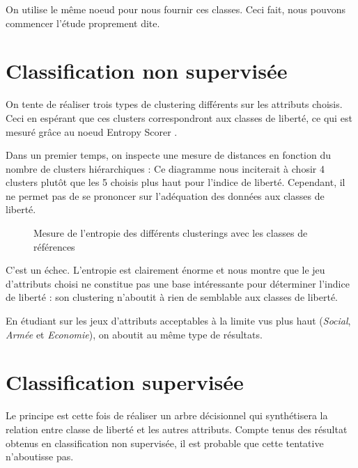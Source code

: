 On utilise le même noeud pour nous fournir ces classes. Ceci fait, nous pouvons commencer l'étude proprement dite.

\section{Classification non supervisée}
On tente de réaliser trois types de clustering différents sur les attributs choisis. Ceci en espérant que ces clusters correspondront aux classes de liberté, ce qui est mesuré grâce au noeud \og Entropy Scorer \fg.

Dans un premier temps, on inspecte une mesure de distances en fonction du nombre de clusters hiérarchiques :
Ce diagramme nous inciterait à chosir 4 clusters plutôt que les 5 choisis plus haut pour l'indice de liberté. Cependant, il ne permet pas de se prononcer sur l'adéquation des données aux classes de liberté.

\begin{figure}[H]
	\centering
	\caption{Mesure de l'entropie des différents clusterings avec les classes de références}
\end{figure}
C'est un échec. L'entropie est clairement énorme et nous montre que le jeu d'attributs choisi ne constitue pas une base intéressante pour déterminer l'indice de liberté : son clustering n'aboutit à rien de semblable aux classes de liberté.

En étudiant sur les jeux d'attributs \og acceptables à la limite \fg vus plus haut (\emph{Social}, \emph{Armée} et \emph{Economie}), on aboutit au même type de résultats.

\section{Classification supervisée}
Le principe est cette fois de réaliser un arbre décisionnel qui synthétisera la relation entre classe de liberté et les autres attributs. Compte tenus des résultat obtenus en classification non supervisée, il est probable que cette tentative n'aboutisse pas.


